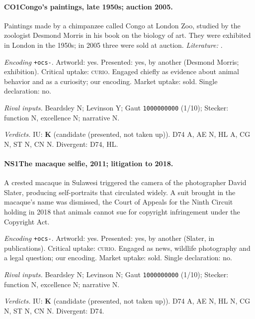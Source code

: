 \paragraph{CO1\enspace Congo's paintings, late 1950s; auction 2005.}
Paintings made by a chimpanzee called Congo at London Zoo, studied by the zoologist Desmond Morris in his book on the biology of art. They were exhibited in London in the 1950s; in 2005 three were sold at auction. \textit{Literature:} \citet{Morris1962}.\par
\noindent\textit{Encoding} \texttt{+ocs-}. Artworld: yes. Presented: yes, by another (Desmond Morris; exhibition). Critical uptake: \textsc{curio}. Engaged chiefly as evidence about animal behavior and as a curiosity; our encoding. Market uptake: sold. Single declaration: no.\par
\noindent\textit{Rival inputs.} Beardsley N; Levinson Y; Gaut \texttt{1000000000} (1/10); Stecker: function N, excellence N; narrative N.\par
\noindent\textit{Verdicts.} IU: \textbf{K} (candidate (presented, not taken up)). D74 A, AE N, HL A, CG N, ST N, CN N. Divergent: D74, HL.\par

\paragraph{NS1\enspace The macaque selfie, 2011; litigation to 2018.}
A crested macaque in Sulawesi triggered the camera of the photographer David Slater, producing self-portraits that circulated widely. A suit brought in the macaque's name was dismissed, the Court of Appeals for the Ninth Circuit holding in 2018 that animals cannot sue for copyright infringement under the Copyright Act.\par
\noindent\textit{Encoding} \texttt{+ocs-}. Artworld: yes. Presented: yes, by another (Slater, in publications). Critical uptake: \textsc{curio}. Engaged as news, wildlife photography and a legal question; our encoding. Market uptake: sold. Single declaration: no.\par
\noindent\textit{Rival inputs.} Beardsley N; Levinson N; Gaut \texttt{1000000000} (1/10); Stecker: function N, excellence N; narrative N.\par
\noindent\textit{Verdicts.} IU: \textbf{K} (candidate (presented, not taken up)). D74 A, AE N, HL N, CG N, ST N, CN N. Divergent: D74.\par

